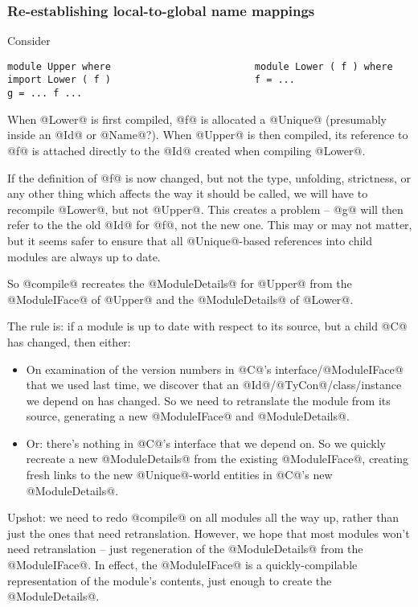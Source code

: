 \documentclass[11pt]{article}
\begin{document}
\subsubsection*{Re-establishing local-to-global name mappings}
Consider
\begin{verbatim}
module Upper where                         module Lower ( f ) where
import Lower ( f )                         f = ...
g = ... f ...
\end{verbatim}
When @Lower@ is first compiled, @f@ is allocated a @Unique@
(presumably inside an @Id@ or @Name@?).  When @Upper@ is then
compiled, its reference to @f@ is attached directly to the
@Id@ created when compiling @Lower@.

If the definition of @f@ is now changed, but not the type,
unfolding, strictness, or any other thing which affects the way
it should be called, we will have to recompile @Lower@, but not
@Upper@.  This creates a problem -- @g@ will then refer to the
the old @Id@ for @f@, not the new one.  This may or may not
matter, but it seems safer to ensure that all @Unique@-based
references into child modules are always up to date.

So @compile@ recreates the @ModuleDetails@ for @Upper@ from 
the @ModuleIFace@ of @Upper@ and the @ModuleDetails@ of @Lower@.

The rule is: if a module is up to date with respect to its
source, but a child @C@ has changed, then either:
\begin{itemize}
\item On examination of the version numbers in @C@'s
      interface/@ModuleIFace@ that we used last time, we discover that
      an @Id@/@TyCon@/class/instance we depend on has changed.  So 
      we need to retranslate the module from its source, generating
      a new @ModuleIFace@ and @ModuleDetails@.
\item Or: there's nothing in @C@'s interface that we depend on.
      So we quickly recreate a new @ModuleDetails@ from the existing
      @ModuleIFace@, creating fresh links to the new @Unique@-world
      entities in @C@'s new @ModuleDetails@.
\end{itemize}

Upshot: we need to redo @compile@ on all modules all the way up,
rather than just the ones that need retranslation.  However, we hope
that most modules won't need retranslation -- just regeneration of the
@ModuleDetails@ from the @ModuleIFace@.  In effect, the @ModuleIFace@
is a quickly-compilable representation of the module's contents, just
enough to create the @ModuleDetails@.
\end{document}
